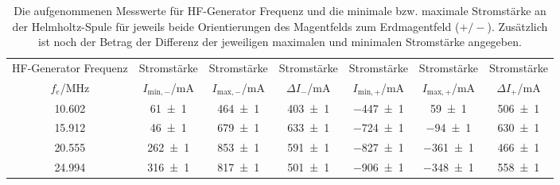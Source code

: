 \begin{table}[!h]
	\centering
	\begin{adjustbox}{width=\textwidth}
	\begin{tabular}{ccccccc}
		\toprule
		HF-Generator Frequenz & Stromstärke & Stromstärke & Stromstärke & Stromstärke & Stromstärke & Stromstärke\\
		$f_e$/\si{\mega\hertz} & $I_{\mathrm{min,-}}$/\si{\milli\ampere} & $I_{\mathrm{max,-}}$/\si{\milli\ampere} & $\Delta I_{-}$/\si{\milli\ampere} & $I_{\mathrm{min,+}}$/\si{\milli\ampere} & $I_{\mathrm{max,+}}$/\si{\milli\ampere} & $\Delta I_{+}$/\si{\milli\ampere}\\
\midrule
		\num{10.602} & \num{61(1)} & \num{464(1)} & \num{403(1)} & \num{-447(1)} & \num{59(1)} & \num{506(1)}\\
		\num{15.912} & \num{46(1)} & \num{679(1)} & \num{633(1)} & \num{-724(1)} & \num{-94(1)} & \num{630(1)}\\
		\num{20.555} & \num{262(1)} & \num{853(1)} & \num{591(1)} & \num{-827(1)} & \num{-361(1)} & \num{466(1)}\\
		\num{24.994} & \num{316(1)} & \num{817(1)} & \num{501(1)} & \num{-906(1)} & \num{-348(1)} & \num{558(1)}\\
		\bottomrule
	\end{tabular}
	\end{adjustbox}
	\caption{Die aufgenommenen Messwerte für HF-Generator Frequenz und die minimale bzw. maximale
Stromstärke an der Helmholtz-Spule für jeweils beide Orientierungen des Magentfelds zum Erdmagentfeld ($+/-$).
Zusätzlich ist noch der Betrag der Differenz der jeweiligen maximalen und minimalen Stromstärke angegeben. \label{tab:messwerte_I}}
\end{table}
